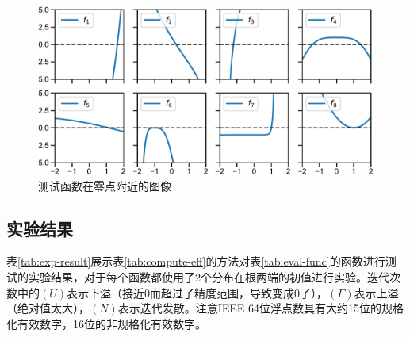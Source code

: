 \begin{figure}[!htbp]
    \centering
    \includegraphics[width=.9\linewidth]{figure/eval-func.pdf}
    \caption{测试函数在零点附近的图像}
    \label{fig:eval-func}
\end{figure}


\subsection{实验结果}

表\ref{tab:exp-result}展示表\ref{tab:compute-eff}的方法对表\ref{tab:eval-func}的函数进行测试的实验结果，对于每个函数都使用了2个分布在根两端的初值进行实验。迭代次数中的$(U)$表示下溢（接近0而超过了精度范围，导致变成0了），$(F)$表示上溢（绝对值太大），$(N)$表示迭代发散。注意IEEE 64位浮点数具有大约15位的规格化有效数字，16位的非规格化有效数字。


